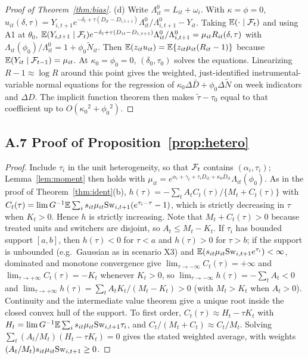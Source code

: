 \begin{proof}[Proof of Theorem~\ref{thm:bias}]
(d) Write $\Lambda^0_{it}=L_{it}+\omega_i$. With $\kappa=\phi=0$,
$u_{it}(\delta,\tau)=Y_{i,t+1}e^{-\delta_t+\tau(D_{it}-D_{i,t+1})}\Lambda^0_{it}/\Lambda^0_{i,t+1}-Y_{it}$. Taking
$\mathbb{E}(\cdot\mid\mathcal{F}_t)$ and using A1 at $\theta_0$,
$\mathbb{E}(Y_{i,t+1}\mid\mathcal{F}_t)e^{-\delta_t+\tau(D_{it}-D_{i,t+1})}\Lambda^0_{it}/\Lambda^0_{i,t+1}=\mu_{it}R_{it}(\delta,\tau)$
with $\Lambda_{it}(\phi_0)/\Lambda^0_{it}=1+\phi_0\tilde N_{it}$. Then
$\mathbb{E}(z_{it}u_{it})=\mathbb{E}\{z_{it}\mu_{it}(R_{it}-1)\}$ because $\mathbb{E}(Y_{it}\mid\mathcal{F}_{t-1})=\mu_{it}$. At
$\kappa_0=\phi_0=0$, $(\delta_{0},\tau_0)$ solves the equations. Linearizing $R-1\approx\log R$ around
this point gives the weighted, just-identified instrumental-variable normal equations for the
regression of $\kappa_0\Delta\bar D+\phi_0\Delta\tilde N$ on week indicators and $\Delta D$. The implicit
function theorem then makes $\tilde\tau-\tau_0$ equal to that coefficient up to
$O(\kappa_0{}^2+\phi_0{}^2)$.
\end{proof}

\subsection{A.7 Proof of Proposition~\ref{prop:hetero}}

\begin{proof}
Include $\tau_i$ in the unit heterogeneity, so that $\mathcal{F}_t$ contains $(\alpha_i,\tau_i)$; Lemma~\ref{lem:moment}
then holds with $\mu_{it}=e^{\alpha_i+\gamma_t+\tau_iD_{it}+\kappa_0\bar D_{it}}\Lambda_{it}(\phi_0)$. As in the
proof of Theorem~\ref{thm:ident}(b), $h(\tau)=-\sum_tA_tC_t(\tau)/\{M_t+C_t(\tau)\}$ with
$C_t(\tau)=\lim G^{-1}\mathbb{E}\sum_is_{it}\mu_{it}\mathrm{Sw}_{i,t+1}(e^{\tau_i-\tau}-1)$, which is strictly decreasing in
$\tau$ when $K_t>0$. Hence $h$ is strictly increasing. Note that $M_t+C_t(\tau)>0$
because treated units and switchers are disjoint, so $A_t\le M_t-K_t$. If $\tau_i$ has bounded
support $[a,b]$, then $h(\tau)<0$ for $\tau<a$ and $h(\tau)>0$ for $\tau>b$; if the support is
unbounded (e.g.\ Gaussian as in scenario X3) and $\mathbb{E}(s_{it}\mu_{it}\mathrm{Sw}_{i,t+1}e^{\tau_i})<\infty$,
dominated and monotone convergence give $\lim_{\tau\to-\infty}C_t(\tau)=+\infty$ and
$\lim_{\tau\to+\infty}C_t(\tau)=-K_t$ whenever $K_t>0$, so $\lim_{\tau\to-\infty}h(\tau)=-\sum_tA_t<0$
and $\lim_{\tau\to+\infty}h(\tau)=\sum_t A_tK_t/(M_t-K_t)>0$ (with $M_t>K_t$ when $A_t>0$). Continuity and the
intermediate value theorem give a unique root inside the closed convex hull of the support. To first order,
$C_t(\tau)\approx H_t-\tau K_t$ with $H_t=\lim G^{-1}\mathbb{E}\sum_is_{it}\mu_{it}\mathrm{Sw}_{i,t+1}\tau_i$, and
$C_t/(M_t+C_t)\approx C_t/M_t$. Solving $\sum_t(A_t/M_t)(H_t-\tau K_t)=0$ gives the stated weighted
average, with weights $(A_t/M_t)s_{it}\mu_{it}\mathrm{Sw}_{i,t+1}\ge0$.
\end{proof}

